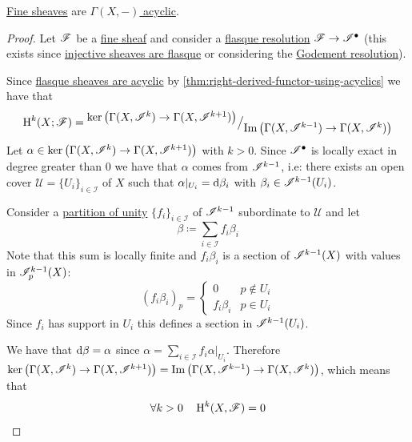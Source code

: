 \documentclass[../../main]{subfiles}
\begin{document}
\begin{proposition} \label{prop:fine-are-acyclic}
  \hyperref[def:fine-sheaf]{Fine sheaves} are \hyperref[def:F-acyclic-object]{\(\Gamma(X, -)\) acyclic}.
\end{proposition}
\begin{proof}
  Let \(\mathscr{F}\) be a \hyperref[def:fine-sheaf]{fine sheaf} and consider a \hyperref[def:flasque-sheaf]{flasque resolution} \(\mathscr{F} \to \mathscr{I}^{\bullet}\) (this exists since \hyperref[lemma:injective-sheaves-are-flasque]{injective sheaves are flasque} or considering the \hyperref[def:godement-resolution]{Godement resolution}).

  Since \hyperref[prop:flasque-are-acyclic]{flasque sheaves are acyclic} by \autoref{thm:right-derived-functor-using-acyclics} we have that
  \begin{equation*}
    \operatorname{H}^{k}(X; \mathscr{F}) = {^{\textstyle \ker\left( \Gamma(X, \mathscr{I}^{k}) \to \Gamma(X, \mathscr{I}^{k+1}) \right)}\big/_{\textstyle \operatorname{Im} \left( \Gamma(X, \mathscr{I}^{k-1}) \to \Gamma(X, \mathscr{I}^{k}) \right)}}
  \end{equation*}
  Let \(\alpha \in \ker\left( \Gamma(X, \mathscr{I}^{k}) \to \Gamma(X, \mathscr{I}^{k+1}) \right)\) with \(k > 0\).
  Since \(\mathscr{I}^{\bullet}\) is locally exact in degree greater than 0 we have that \(\alpha\) comes from \(\mathscr{I}^{k-1}\), i.e: there exists an open cover \(\mathscr{U} = \{U_{i}\}_{i \in \mathcal{I}}\) of \(X\) such that \(\alpha|_{U_{i}} = \mathrm{d}\beta_{i}\) with \(\beta_{i} \in \mathscr{I}^{k-1}(U_{i})\).

  Consider a \hyperref[def:partition-of-unity]{partition of unity} \(\{f_{i}\}_{i \in \mathcal{I}}\) of \(\mathscr{I}^{k-1}\) subordinate to \(\mathscr{U}\) and let
  \begin{equation*}
    \beta \coloneq \sum_{i \in \mathcal{I}} f_{i}\beta_{i}
  \end{equation*}
  Note that this sum is locally finite and \(f_{i}\beta_{i}\) is a section of \(\mathscr{I}^{k-1}(X)\) with values in \(\mathscr{I}_{p}^{k-1}(X)\):
  \begin{equation*}
    (f_{i}\beta_{i})_{p} = \begin{cases}
      0 & p \notin U_{i} \\
      f_{i}\beta_{i} & p \in U_{i}
    \end{cases}
  \end{equation*}
  Since \(f_{i}\) has support in \(U_{i}\) this defines a section in \(\mathscr{I}^{k-1}(U_{i})\).

  We have that \(\mathrm{d}\beta = \alpha\) since \(\alpha = \sum_{i \in \mathcal{I}} f_{i}\alpha|_{U_{i}}\).
  Therefore \(\ker\left( \Gamma(X, \mathscr{I}^{k}) \to \Gamma(X, \mathscr{I}^{k+1}) \right) = \operatorname{Im} \left( \Gamma(X, \mathscr{I}^{k-1}) \to \Gamma(X, \mathscr{I}^{k}) \right)\), which means that
  \begin{equation*}
    \forall k > 0 \quad \operatorname{H}^{k}(X, \mathscr{F}) = 0 \qedhere
  \end{equation*}
\end{proof}
\end{document}
